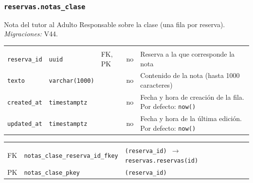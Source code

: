 \subsubsection{\texorpdfstring{\texttt{reservas.notas\_\allowbreak{}clase}}{reservas.notas\_clase}}\label{dd:reservas.notas_clase}

Nota del tutor al Adulto Responsable sobre la clase (una fila por reserva). \emph{Migraciones:} V44.

{\small
\begin{xltabular}{\textwidth}{@{}>{\raggedright\arraybackslash}p{3.6cm} >{\raggedright\arraybackslash}p{2.3cm} >{\raggedright\arraybackslash}p{1cm} >{\centering\arraybackslash}p{0.85cm} L@{}}
    \toprule
     &  &  &  &  \\
    \midrule
    \endfirsthead
    \toprule
     &  &  &  &  \\
    \midrule
    \endhead
    \bottomrule
    \endfoot
    \texttt{reserva\_\allowbreak{}id} & \texttt{uuid} & FK, PK & no & Reserva a la que corresponde la nota \\
    \texttt{texto} & \texttt{varchar(\allowbreak{}1000)} &  & no & Contenido de la nota (hasta 1000 caracteres) \\
    \texttt{created\_\allowbreak{}at} & \texttt{timestamptz} &  & no & Fecha y hora de creación de la fila. Por defecto: \texttt{now(\allowbreak{})} \\
    \texttt{updated\_\allowbreak{}at} & \texttt{timestamptz} &  & no & Fecha y hora de la última edición. Por defecto: \texttt{now(\allowbreak{})} \\
\end{xltabular}
}

{\small
\begin{xltabular}{\textwidth}{@{}>{\raggedright\arraybackslash}p{1.7cm} >{\raggedright\arraybackslash}p{4.6cm} L@{}}
    \toprule
     &  &  \\
    \midrule
    \endfirsthead
    \toprule
     &  &  \\
    \midrule
    \endhead
    \bottomrule
    \endfoot
    FK & \texttt{notas\_\allowbreak{}clase\_\allowbreak{}reserva\_\allowbreak{}id\_\allowbreak{}fkey} & \texttt{(\allowbreak{}reserva\_\allowbreak{}id) $\rightarrow$ reservas.reservas(\allowbreak{}id)} \\
    PK & \texttt{notas\_\allowbreak{}clase\_\allowbreak{}pkey} & \texttt{(\allowbreak{}reserva\_\allowbreak{}id)} \\
\end{xltabular}
}

